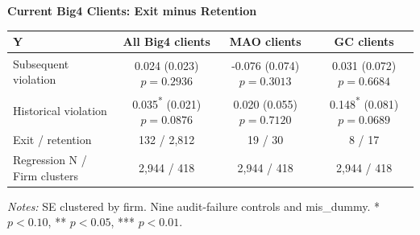 \documentclass[10pt]{article}
\newcommand{\sym}[1]{\textsuperscript{#1}}
\begin{document}
\fontsize{10}{12}\selectfont\setlength{\parindent}{0pt}
\noindent\textbf{Current Big4 Clients: Exit minus Retention}\par\medskip
\setlength{\tabcolsep}{3pt}\renewcommand{\arraystretch}{1.15}
\begin{tabular*}{\textwidth}{@{\extracolsep{\fill}}lccc@{}}
\toprule
Y & All Big4 clients & MAO clients & GC clients \\
\midrule
Subsequent violation & \shortstack{0.024\sym{}\\(0.023)\\$p=0.2936$} & \shortstack{-0.076\sym{}\\(0.074)\\$p=0.3013$} & \shortstack{0.031\sym{}\\(0.072)\\$p=0.6684$} \\ \addlinespace
Historical violation & \shortstack{0.035\sym{*}\\(0.021)\\$p=0.0876$} & \shortstack{0.020\sym{}\\(0.055)\\$p=0.7120$} & \shortstack{0.148\sym{*}\\(0.081)\\$p=0.0689$} \\ \addlinespace
Exit / retention & 132 / 2,812 & 19 / 30 & 8 / 17 \\
Regression N / Firm clusters & 2,944 / 418 & 2,944 / 418 & 2,944 / 418 \\
\bottomrule
\end{tabular*}
\par\medskip\fontsize{9}{11}\selectfont\textit{Notes:} SE clustered by firm. Nine audit-failure controls and mis\_dummy. * $p<0.10$, ** $p<0.05$, *** $p<0.01$.
\end{document}
